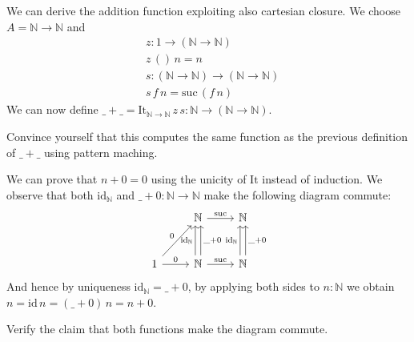 \documentclass{article}
\newcommand{\id}{\mathrm{id}}
\newcommand{\Nat}{\mathbb{N}}
\newcommand{\suc}{\mathrm{suc}}
\newcommand{\It}{\mathrm{It}}
\begin{document}
We can derive the addition function exploiting also cartesian closure. We choose $A = \Nat \to \Nat$ and
\begin{align*}
& z : 1 \to (\Nat \to \Nat) \\
& z\,()\,n = n \\
& s : (\Nat \to \Nat) \to (\Nat \to \Nat) \\
& s\,f\,n = \suc\,(f\,n)
\end{align*}
We can now define $\_+\_ = \It_{\Nat\to\Nat}\,z\,s : \Nat \to (\Nat \to \Nat)$.
\begin{Exercise}
  Convince yourself that this computes the same function as the previous definition of $\_+\_$ using pattern maching.
\end{Exercise}

We can prove that $n + 0 = 0$ using the unicity of $\It$ instead of induction. We observe that both $\id_\Nat$ and $\_+0 : \Nat \to \Nat$ make the following diagram commute:
\[\begin{tikzcd}[row sep = large]
& \Nat \arrow[r,"\suc"] & \Nat \\
1 \arrow[ur,"0"] \arrow[r,"0"] & \Nat \arrow[r,"\suc"] \arrow[u, shift left,"\id_\Nat" left] 
\arrow[u,shift right, "\_+0" right]
& \Nat  \arrow[u,shift left,"\id_\Nat" left]\arrow[u,shift right,"\_+0" right]
\end{tikzcd}\]  
And hence by uniqueness $\id_\Nat = \_+0$, by applying both sides to $n:\Nat$ we obtain 
$n = \id\,n = (\_ + 0)\,n = n + 0$. 
\begin{Exercise}
  Verify the claim that both functions make the diagram commute.
\end{Exercise}
\end{document}
